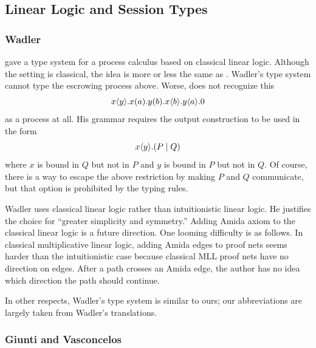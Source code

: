 \subsection{Linear Logic and Session Types}

\subsubsection{Wadler}

\citet{wadler2012propositions} gave a type system for a process
calculus based on classical linear logic.
Although the setting is classical, the idea is more or less the same as
\citet{pfenning2010}.
Wadler's type system cannot type the escrowing process above.
Worse, \citet{wadler2012propositions} does not recognize this
\[
 {x}\langle{y}\rangle.{{{x}({a}).{{{y}({b}).{{x}\langle{b}\rangle.{{y}\langle{a}\rangle.{0}}}}}}}
\]
as a process at all.
His grammar requires the output construction to be used in the form
\[
 {x}\langle{y}\rangle.{(P\mid Q)}
\]
where $x$ is bound in $Q$ but not in $P$ and $y$ is bound in $P$ but not
in $Q$.
Of course, there is a way to escape the above restriction by making $P$
and $Q$ communicate, but that option is prohibited by the typing rules.

Wadler uses classical linear logic rather than intuitionistic linear
logic.
He justifies the choice for ``greater simplicity and symmetry.''
Adding Amida axiom to the classical linear logic is a future direction.
One looming difficulty is as follows.
In classical multiplicative linear logic,
adding Amida edges to proof nets seems harder than the intuitionistic case
because classical MLL proof nets have no direction on edges.
After a path crosses an Amida edge, the author has no idea which
direction the path should continue.

In other respects,
Wadler's type system is similar to ours;
our abbreviations are largely taken from Wadler's translations.

\subsubsection{Giunti and Vasconcelos}


